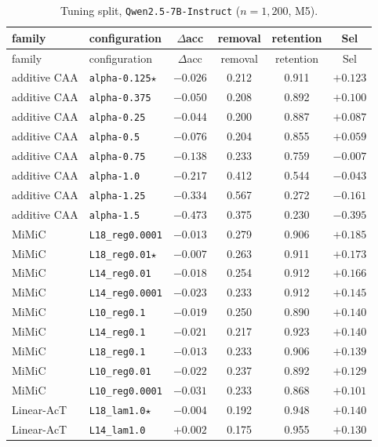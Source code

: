 {\scriptsize\setlength{\tabcolsep}{3pt}
\begin{longtable}{l|l|c|cc|c}
\caption{Tuning split, \texttt{Qwen2.5-7B-Instruct} ($n=1{,}200$, M5).}\label{tab:tune-qwen}\\
\hline
family & configuration & $\Delta$acc & removal & retention & Sel \\
\hline
\endfirsthead
\hline
family & configuration & $\Delta$acc & removal & retention & Sel \\
\hline
\endhead
additive CAA & \texttt{alpha-0.125}$\star$ & $-0.026$ & 0.212 & 0.911 & $+0.123$ \\
additive CAA & \texttt{alpha-0.375} & $-0.050$ & 0.208 & 0.892 & $+0.100$ \\
additive CAA & \texttt{alpha-0.25} & $-0.044$ & 0.200 & 0.887 & $+0.087$ \\
additive CAA & \texttt{alpha-0.5} & $-0.076$ & 0.204 & 0.855 & $+0.059$ \\
additive CAA & \texttt{alpha-0.75} & $-0.138$ & 0.233 & 0.759 & $-0.007$ \\
additive CAA & \texttt{alpha-1.0} & $-0.217$ & 0.412 & 0.544 & $-0.043$ \\
additive CAA & \texttt{alpha-1.25} & $-0.334$ & 0.567 & 0.272 & $-0.161$ \\
additive CAA & \texttt{alpha-1.5} & $-0.473$ & 0.375 & 0.230 & $-0.395$ \\
MiMiC & \texttt{L18\_reg0.0001} & $-0.013$ & 0.279 & 0.906 & $+0.185$ \\
MiMiC & \texttt{L18\_reg0.01}$\star$ & $-0.007$ & 0.263 & 0.911 & $+0.173$ \\
MiMiC & \texttt{L14\_reg0.01} & $-0.018$ & 0.254 & 0.912 & $+0.166$ \\
MiMiC & \texttt{L14\_reg0.0001} & $-0.023$ & 0.233 & 0.912 & $+0.145$ \\
MiMiC & \texttt{L10\_reg0.1} & $-0.019$ & 0.250 & 0.890 & $+0.140$ \\
MiMiC & \texttt{L14\_reg0.1} & $-0.021$ & 0.217 & 0.923 & $+0.140$ \\
MiMiC & \texttt{L18\_reg0.1} & $-0.013$ & 0.233 & 0.906 & $+0.139$ \\
MiMiC & \texttt{L10\_reg0.01} & $-0.022$ & 0.237 & 0.892 & $+0.129$ \\
MiMiC & \texttt{L10\_reg0.0001} & $-0.031$ & 0.233 & 0.868 & $+0.101$ \\
Linear-AcT & \texttt{L18\_lam1.0}$\star$ & $-0.004$ & 0.192 & 0.948 & $+0.140$ \\
Linear-AcT & \texttt{L14\_lam1.0} & $+0.002$ & 0.175 & 0.955 & $+0.130$ \\

\end{longtable}}
